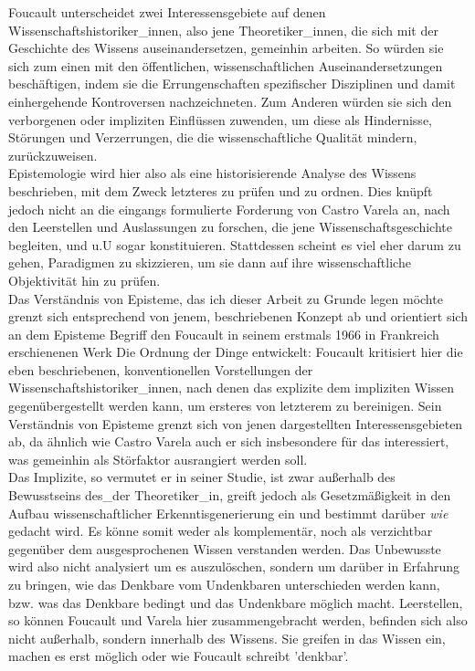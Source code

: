 Foucault unterscheidet zwei Interessensgebiete auf denen
Wissenschaftshistoriker\_innen, also jene Theoretiker\_innen, die sich mit der
Geschichte des Wissens auseinandersetzen, gemeinhin arbeiten. So würden sie sich
zum einen mit den öffentlichen, wissenschaftlichen Auseinandersetzungen
beschäftigen, indem sie die Errungenschaften spezifischer Disziplinen und damit
einhergehende Kontroversen nachzeichneten. Zum Anderen würden sie sich den
verborgenen oder impliziten Einflüssen zuwenden, um diese als Hindernisse,
Störungen und Verzerrungen, die die wissenschaftliche Qualität mindern,
zurückzuweisen.\footnotemark {} \\
Epistemologie
wird hier also als eine historisierende Analyse des Wissens beschrieben, mit dem
Zweck letzteres zu prüfen und zu ordnen.  Dies knüpft jedoch nicht an die
eingangs formulierte Forderung von Castro Varela an, nach den Leerstellen und
Auslassungen zu forschen, die jene Wissenschaftsgeschichte begleiten, und u.U
sogar konstituieren. Stattdessen scheint es viel eher darum zu gehen, Paradigmen
zu skizzieren, um sie dann auf ihre wissenschaftliche Objektivität hin zu
prüfen.\\

\noindent Das Verständnis von Episteme, das ich dieser Arbeit zu Grunde legen möchte
grenzt sich entsprechend von jenem, beschriebenen Konzept ab und orientiert sich
an dem Episteme Begriff den Foucault in seinem erstmals 1966 in Frankreich
erschienenen Werk \glqq Die Ordnung der Dinge\grqq \footnotemark {} entwickelt:
Foucault kritisiert hier die eben beschriebenen, konventionellen Vorstellungen
der Wissenschaftshistoriker\_innen, nach denen das explizite dem impliziten
Wissen gegenübergestellt werden kann, um ersteres von letzterem zu bereinigen.
Sein Verständnis von Episteme grenzt sich von jenen dargestellten
Interessensgebieten ab, da ähnlich wie Castro Varela auch er sich insbesondere
für das interessiert, was gemeinhin als Störfaktor ausrangiert werden soll. \\
Das
Implizite, so vermutet er in seiner Studie, ist zwar außerhalb des Bewusstseins
des\_der Theoretiker\_in, greift jedoch als Gesetzmäßigkeit in den Aufbau
wissenschaftlicher Erkenntisgenerierung ein und bestimmt darüber \textit{wie}
gedacht wird.\footnotemark {} 
Es könne somit weder als komplementär, noch als verzichtbar
gegenüber dem ausgesprochenen Wissen verstanden werden.\footnotemark
{} 
 Das Unbewusste wird
also nicht analysiert um es auszulöschen, sondern um darüber in Erfahrung zu
bringen, wie das Denkbare vom Undenkbaren unterschieden werden kann, bzw. was
das Denkbare bedingt und das Undenkbare möglich macht. Leerstellen, so können
Foucault und Varela hier zusammengebracht werden, befinden sich also nicht
außerhalb, sondern innerhalb des Wissens. Sie greifen in das Wissen ein, machen
es erst möglich oder wie Foucault schreibt 'denkbar'.\\ 

